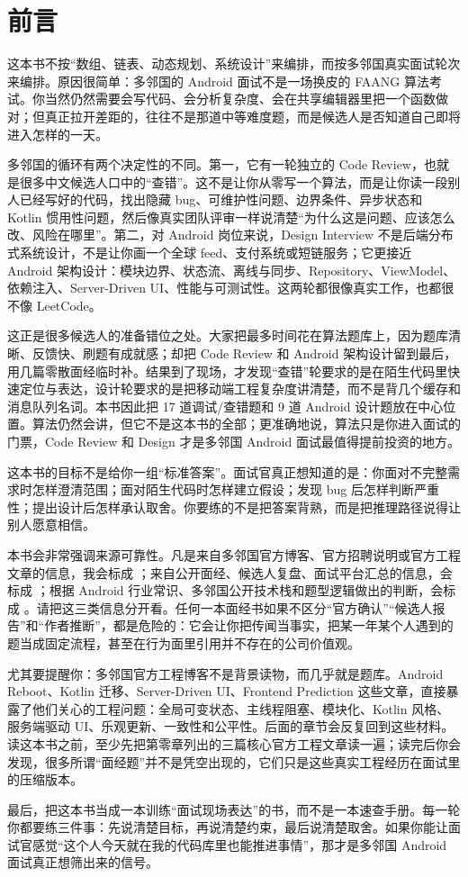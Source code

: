 \chapter*{前言}

这本书不按“数组、链表、动态规划、系统设计”来编排，而按多邻国真实面试轮次来编排。原因很简单：多邻国的 Android 面试不是一场换皮的 FAANG 算法考试。你当然仍然需要会写代码、会分析复杂度、会在共享编辑器里把一个函数做对；但真正拉开差距的，往往不是那道中等难度题，而是候选人是否知道自己即将进入怎样的一天。

多邻国的循环有两个决定性的不同。第一，它有一轮独立的 Code Review，也就是很多中文候选人口中的“查错”。这不是让你从零写一个算法，而是让你读一段别人已经写好的代码，找出隐藏 bug、可维护性问题、边界条件、异步状态和 Kotlin 惯用性问题，然后像真实团队评审一样说清楚“为什么这是问题、应该怎么改、风险在哪里”。第二，对 Android 岗位来说，Design Interview 不是后端分布式系统设计，不是让你画一个全球 feed、支付系统或短链服务；它更接近 Android 架构设计：模块边界、状态流、离线与同步、Repository、ViewModel、依赖注入、Server-Driven UI、性能与可测试性。这两轮都很像真实工作，也都很不像 LeetCode。

这正是很多候选人的准备错位之处。大家把最多时间花在算法题库上，因为题库清晰、反馈快、刷题有成就感；却把 Code Review 和 Android 架构设计留到最后，用几篇零散面经临时补。结果到了现场，才发现“查错”轮要求的是在陌生代码里快速定位与表达，设计轮要求的是把移动端工程复杂度讲清楚，而不是背几个缓存和消息队列名词。本书因此把 17 道调试/查错题和 9 道 Android 设计题放在中心位置。算法仍然会讲，但它不是这本书的全部；更准确地说，算法只是你进入面试的门票，Code Review 和 Design 才是多邻国 Android 面试最值得提前投资的地方。

\begin{idea}
这本书的目标不是给你一组“标准答案”。面试官真正想知道的是：你面对不完整需求时怎样澄清范围；面对陌生代码时怎样建立假设；发现 bug 后怎样判断严重性；提出设计后怎样承认取舍。你要练的不是把答案背熟，而是把推理路径说得让别人愿意相信。
\end{idea}

本书会非常强调来源可靠性。凡是来自多邻国官方博客、官方招聘说明或官方工程文章的信息，我会标成 \srcofficial；来自公开面经、候选人复盘、面试平台汇总的信息，会标成 \srccommunity；根据 Android 行业常识、多邻国公开技术栈和题型逻辑做出的判断，会标成 \srcinferred。请把这三类信息分开看。任何一本面经书如果不区分“官方确认”“候选人报告”和“作者推断”，都是危险的：它会让你把传闻当事实，把某一年某个人遇到的题当成固定流程，甚至在行为面里引用并不存在的公司价值观。

尤其要提醒你：多邻国官方工程博客不是背景读物，而几乎就是题库。Android Reboot、Kotlin 迁移、Server-Driven UI、Frontend Prediction 这些文章，直接暴露了他们关心的工程问题：全局可变状态、主线程阻塞、模块化、Kotlin 风格、服务端驱动 UI、乐观更新、一致性和公平性。后面的章节会反复回到这些材料。读这本书之前，至少先把第零章列出的三篇核心官方工程文章读一遍；读完后你会发现，很多所谓“面经题”并不是凭空出现的，它们只是这些真实工程经历在面试里的压缩版本。

最后，把这本书当成一本训练“面试现场表达”的书，而不是一本速查手册。每一轮你都要练三件事：先说清楚目标，再说清楚约束，最后说清楚取舍。如果你能让面试官感觉“这个人今天就在我的代码库里也能推进事情”，那才是多邻国 Android 面试真正想筛出来的信号。